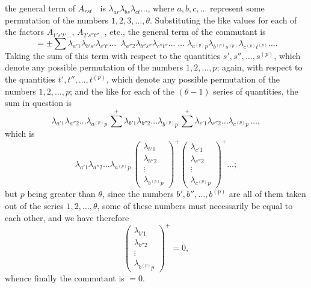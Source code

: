 \documentclass[11pt]{article}
\begin{document}
\noindent the general term of $A_{rst\dots}$ is $\lambda_{ar}\lambda_{bs}\lambda_{ct}\dots$, where $a, b, c, \dots$ represent some permutation of the numbers $1, 2, 3, \dots, \theta$. Substituting the like values for each of the factors $A_{1's't'\dots}$, $A_{2's''t''\dots}$, etc., the general term of the commutant is
\[
= \pm \sum \lambda_{a'1}\lambda_{b's'}\lambda_{c't'}\dots\;\;\lambda_{a''2}\lambda_{b''s''}\lambda_{c''t''}\dots\;\dots\;\lambda_{a^{(p)}p}\lambda_{b^{(p)}s^{(p)}}\lambda_{c^{(p)}t^{(p)}}\dots.
\]
Taking the sum of this term with respect to the quantities $s', s'', \dots, s^{(p)}$, which denote any possible permutation of the numbers $1, 2, \dots, p$; again, with respect to the quantities $t', t'', \dots, t^{(p)}$, which denote any possible permutation of the numbers $1, 2, \dots, p$; and the like for each of the $(\theta - 1)$ series of quantities, the sum in question is
\[
\lambda_{a'1}\lambda_{a''2}\dots\lambda_{a^{(p)}p}\,\sum^{+}\!\lambda_{b'1}\lambda_{b''2}\dots\lambda_{b^{(p)}p}\,\sum^{+}\!\lambda_{c'1}\lambda_{c''2}\dots\lambda_{c^{(p)}p}\,\dots,
\]
which is
\[
\lambda_{a'1}\lambda_{a''2}\dots\lambda_{a^{(p)}p}\,\begin{pmatrix}\lambda_{b'1}\\ \lambda_{b''2}\\ \vdots\\ \lambda_{b^{(p)}p}\end{pmatrix}^{+}\!\begin{pmatrix}\lambda_{c'1}\\ \lambda_{c''2}\\ \vdots\\ \lambda_{c^{(p)}p}\end{pmatrix}^{+}\dots;
\]
but $p$ being greater than $\theta$, since the numbers $b', b'', \dots, b^{(p)}$ are all of them taken out of the series $1, 2, \dots, \theta$, some of these numbers must necessarily be equal to each other, and we have therefore
\[
\begin{pmatrix}\lambda_{b'1}\\ \lambda_{b''2}\\ \vdots\\ \lambda_{b^{(p)}p}\end{pmatrix}^{+} = 0,
\]
whence finally the commutant is $=0$.
\end{document}
